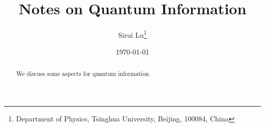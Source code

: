 \documentclass[12pt]{article}
\author{Sirui Lu\footnote{Department of Physics, Tsinghua University, Beijing, 100084, China}}
\begin{document}
\title{Notes on Quantum Information}


\date{\today}

\maketitle

\begin{abstract}
We discuss some aspects for quantum information \cite{Jaynes:1957fy}
\end{abstract}





\end{document}
